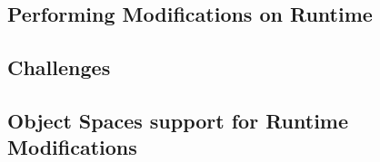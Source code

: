 \subsection{Performing Modifications on Runtime}

\subsection{Challenges}

\subsection{Object Spaces support for Runtime Modifications}

